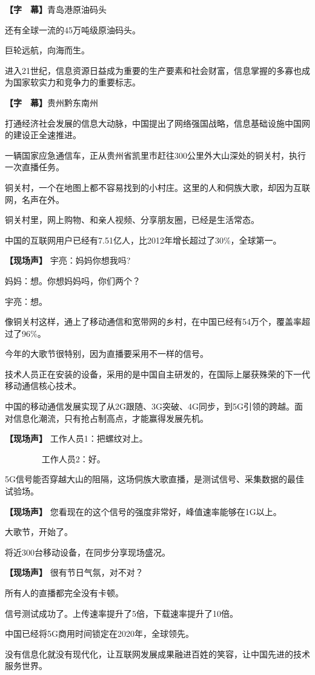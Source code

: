 \documentclass{ctexart}
\newcommand{\zkh}[1]{\textbf{\hspace{-2.7em} 【#1】}}
\begin{document}
 \zkh{字　幕}青岛港原油码头

 还有全球一流的45万吨级原油码头。

 巨轮远航，向海而生。

 
进入21世纪，信息资源日益成为重要的生产要素和社会财富，信息掌握的多寡也成为国家软实力和竞争力的重要标志。

 \zkh{字　幕}贵州黔东南州

 
打通经济社会发展的信息大动脉，中国提出了网络强国战略，信息基础设施中国网的建设正全速推进。

一辆国家应急通信车，正从贵州省凯里市赶往300公里外大山深处的铜关村，执行一次直播任务。

铜关村，一个在地图上都不容易找到的小村庄。这里的人和侗族大歌，却因为互联网，名声在外。

 铜关村里，网上购物、和亲人视频、分享朋友圈，已经是生活常态。

 中国的互联网用户已经有7.51亿人，比2012年增长超过了30{\%}，全球第一。

 \zkh{现场声} 宇亮：妈妈你想我吗?

 妈妈：想。你想妈妈吗，你们两个？

 宇亮：想。

 
像铜关村这样，通上了移动通信和宽带网的乡村，在中国已经有54万个，覆盖率超过了96{\%}。

 今年的大歌节很特别，因为直播要采用不一样的信号。

 
技术人员正在安装的设备，采用的是中国自主研发的，在国际上屡获殊荣的下一代移动通信核心技术。

中国的移动通信发展实现了从2G跟随、3G突破、4G同步，到5G引领的跨越。面对信息化潮流，只有抢占制高点，才能赢得发展先机。

 \zkh{现场声} 工作人员1：把螺纹对上。

 　　　　 工作人员2：好。

 
5G信号能否穿越大山的阻隔，这场侗族大歌直播，是测试信号、采集数据的最佳试验场。

 \zkh{现场声} 您看现在的这个信号的强度非常好，峰值速率能够在1G以上。

 大歌节，开始了。

 将近300台移动设备，在同步分享现场盛况。

 \zkh{现场声} 很有节日气氛，对不对？

 所有人的直播都完全没有卡顿。

 信号测试成功了。上传速率提升了5倍，下载速率提升了10倍。

 中国已经将5G商用时间锁定在2020年，全球领先。

没有信息化就没有现代化，让互联网发展成果融进百姓的笑容，让中国先进的技术服务世界。
\end{document}
